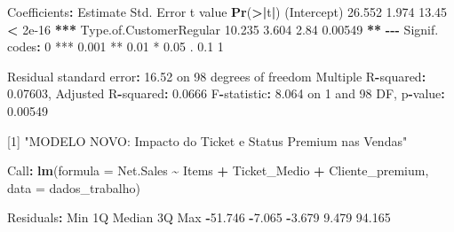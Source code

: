 \documentclass[
]{article}
\newenvironment{Shaded}{\begin{snugshade}}{\end{snugshade}}
\newcommand{\AttributeTok}[1]{\textcolor[rgb]{0.13,0.29,0.53}{#1}}
\newcommand{\DecValTok}[1]{\textcolor[rgb]{0.00,0.00,0.81}{#1}}
\newcommand{\ErrorTok}[1]{\textcolor[rgb]{0.64,0.00,0.00}{\textbf{#1}}}
\newcommand{\FloatTok}[1]{\textcolor[rgb]{0.00,0.00,0.81}{#1}}
\newcommand{\FunctionTok}[1]{\textcolor[rgb]{0.13,0.29,0.53}{\textbf{#1}}}
\newcommand{\NormalTok}[1]{#1}
\newcommand{\SpecialCharTok}[1]{\textcolor[rgb]{0.81,0.36,0.00}{\textbf{#1}}}
\newcommand{\StringTok}[1]{\textcolor[rgb]{0.31,0.60,0.02}{#1}}
\begin{document}
\begin{Shaded}
\begin{Highlighting}[]
\NormalTok{Coefficients}\SpecialCharTok{:}
\NormalTok{                        Estimate Std. Error t value }\FunctionTok{Pr}\NormalTok{(}\SpecialCharTok{\textgreater{}}\ErrorTok{|}\NormalTok{t}\SpecialCharTok{|}\NormalTok{)    }
\NormalTok{(Intercept)               }\FloatTok{26.552}      \FloatTok{1.974}   \FloatTok{13.45}  \SpecialCharTok{\textless{}} \FloatTok{2e{-}16} \SpecialCharTok{**}\ErrorTok{*}
\NormalTok{Type.of.CustomerRegular   }\FloatTok{10.235}      \FloatTok{3.604}    \FloatTok{2.84}  \FloatTok{0.00549} \SpecialCharTok{**}
\SpecialCharTok{{-}{-}{-}}
\NormalTok{Signif. codes}\SpecialCharTok{:}  \DecValTok{0} \StringTok{\textquotesingle{}***\textquotesingle{}} \FloatTok{0.001} \StringTok{\textquotesingle{}**\textquotesingle{}} \FloatTok{0.01} \StringTok{\textquotesingle{}*\textquotesingle{}} \FloatTok{0.05} \StringTok{\textquotesingle{}.\textquotesingle{}} \FloatTok{0.1} \StringTok{\textquotesingle{} \textquotesingle{}} \DecValTok{1}

\NormalTok{Residual standard error}\SpecialCharTok{:} \FloatTok{16.52}\NormalTok{ on }\DecValTok{98}\NormalTok{ degrees of freedom}
\NormalTok{Multiple R}\SpecialCharTok{{-}}\NormalTok{squared}\SpecialCharTok{:}  \FloatTok{0.07603}\NormalTok{,   Adjusted R}\SpecialCharTok{{-}}\NormalTok{squared}\SpecialCharTok{:}  \FloatTok{0.0666} 
\NormalTok{F}\SpecialCharTok{{-}}\NormalTok{statistic}\SpecialCharTok{:} \FloatTok{8.064}\NormalTok{ on }\DecValTok{1}\NormalTok{ and }\DecValTok{98}\NormalTok{ DF,  p}\SpecialCharTok{{-}}\NormalTok{value}\SpecialCharTok{:} \FloatTok{0.00549}

\NormalTok{[}\DecValTok{1}\NormalTok{] }\StringTok{"MODELO NOVO: Impacto do Ticket e Status Premium nas Vendas"}

\NormalTok{Call}\SpecialCharTok{:}
\FunctionTok{lm}\NormalTok{(}\AttributeTok{formula =}\NormalTok{ Net.Sales }\SpecialCharTok{\textasciitilde{}}\NormalTok{ Items }\SpecialCharTok{+}\NormalTok{ Ticket\_Medio }\SpecialCharTok{+}\NormalTok{ Cliente\_premium,}
    \AttributeTok{data =}\NormalTok{ dados\_trabalho)}

\NormalTok{Residuals}\SpecialCharTok{:}
\NormalTok{    Min      }\DecValTok{1}\NormalTok{Q  Median      }\DecValTok{3}\NormalTok{Q     Max }
\SpecialCharTok{{-}}\FloatTok{51.746}  \SpecialCharTok{{-}}\FloatTok{7.065}  \SpecialCharTok{{-}}\FloatTok{3.679}   \FloatTok{9.479}  \FloatTok{94.165}


\end{Highlighting}
\end{Shaded}
\end{document}
